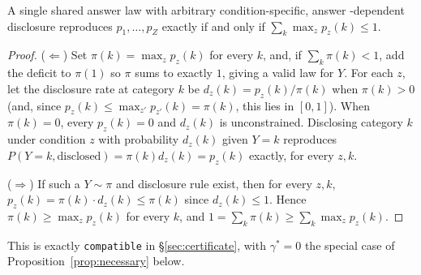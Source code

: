\begin{proposition}[Compatibility]
\label{prop:compatible}
A single shared answer law with arbitrary condition-specific, answer
-dependent disclosure reproduces $p_1,\dots,p_Z$ exactly if and only if
$\sum_k \max_z p_z(k) \le 1$.
\end{proposition}
\begin{proof}
($\Leftarrow$) Set $\pi(k)=\max_z p_z(k)$ for every $k$, and, if
$\sum_k\pi(k)<1$, add the deficit to $\pi(1)$ so $\pi$ sums to exactly $1$,
giving a valid law for $Y$. For each $z$, let the disclosure rate at
category $k$ be $d_z(k)=p_z(k)/\pi(k)$ when $\pi(k)>0$ (and, since
$p_z(k)\le\max_{z'}p_{z'}(k)=\pi(k)$, this lies in $[0,1]$). When $\pi(k)=0$,
every $p_z(k)=0$ and $d_z(k)$ is unconstrained. Disclosing category $k$ under
condition $z$ with probability $d_z(k)$ given $Y=k$ reproduces
$P(Y=k,\text{disclosed})=\pi(k)d_z(k)=p_z(k)$ exactly, for every $z,k$.

($\Rightarrow$) If such a $Y\sim\pi$ and disclosure rule exist, then for every
$z,k$, $p_z(k)=\pi(k)\cdot d_z(k)\le\pi(k)$ since $d_z(k)\le1$. Hence
$\pi(k)\ge\max_z p_z(k)$ for every $k$, and $1=\sum_k\pi(k)\ge\sum_k\max_z
p_z(k)$.
\end{proof}

This is exactly \texttt{compatible} in \S\ref{sec:certificate}, with
$\gamma^*=0$ the special case of Proposition~\ref{prop:necessary} below.

